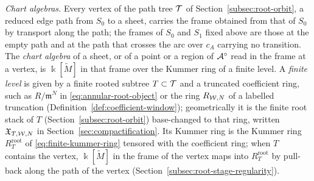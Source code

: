 \emph{Chart algebras.}  Every vertex of the path tree $\mathcal T$ of
Section~\ref{subsec:root-orbit}, a reduced edge path from $S_0$ to a sheet,
carries the frame obtained from that of $S_0$ by transport along the path;
the frames of $S_0$ and $S_1$ fixed above are those at the empty path and at
the path that crosses the arc over $c_A$ carrying no transition.  The
\emph{chart algebra} of a sheet, or of a point or a region of $\mathcal A^\circ$
read in the frame at a vertex, is $\Bbbk[\widetilde M]$ in that frame over
the Kummer ring of a finite level.  A \emph{finite level} is given by a
finite rooted subtree $T\subset\mathcal T$ and a truncated coefficient ring, such
as $R/\mathfrak m^N$ in \eqref{eq:annular-root-object} or the ring
$R_{\mathcal W,N}$ of a labelled truncation
(Definition~\ref{def:coefficient-window}); geometrically it is the finite
root stack of $T$ (Section~\ref{subsec:root-orbit}) base-changed to that
ring, written $\mathfrak X_{T,\mathcal W,N}$ in Section~\ref{sec:compactification}.
Its Kummer ring is the Kummer ring $R_T^{\mathrm{root}}$ of
\eqref{eq:finite-kummer-ring} tensored with the coefficient ring; when $T$
contains the vertex, $\Bbbk[\widetilde M]$ in the frame of the vertex maps
into $R_T^{\mathrm{root}}$ by pull-back along the path of the vertex
(Section~\ref{subsec:root-stage-regularity}).


